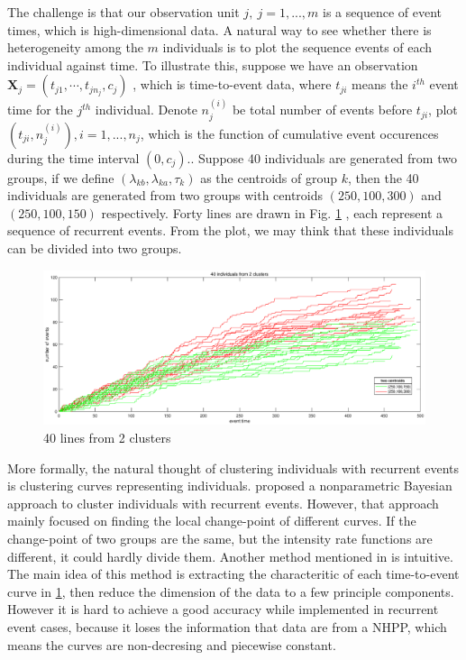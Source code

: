 \documentclass[12pt]{article}
\begin{document}
The challenge is that our observation unit $j,~j=1,...,m$ is a sequence of event times, which is high-dimensional data. A natural way to see whether there is heterogeneity among the $m$ individuals is to plot the sequence events of each individual against time. To illustrate this, suppose we have an observation $\pmb X_j = (t_{j1}, \cdots, t_{jn_j}, c_j)$ , which is time-to-event data, where $t_{ji}$ means the $i^{th}$ event time for the $j^{th}$ individual. Denote $n_j^{(i)}$ be total number of events before $t_{ji}$, plot $(t_{ji},n_j^{(i)}),i=1,...,n_j$, which is the function of cumulative event occurences during the time interval $(0,c_j)$.. Suppose 40 individuals are generated from two groups, if we define $(\lambda_{kb},\lambda_{ka},\tau_k)$ as the centroids of group $k$, then the 40 individuals are generated from two groups with centroids $(250,100,300)$ and $(250,100,150)$ respectively. Forty lines are drawn in Fig. \ref{fig:forty_lines} , each represent a sequence of recurrent events. From the plot, we may think that these individuals can be divided into two groups.





\begin{figure} [htp]
 \includegraphics[width=\textwidth,height=0.6\textheight]{./figure/forty_lines.eps}
  \vspace{-30pt}
  \caption{40 lines from 2 clusters  }\label{fig:forty_lines}
\end{figure} %





More formally, the natural thought of clustering individuals with recurrent events is clustering curves representing individuals. \citet{dass2015clustering} proposed a nonparametric Bayesian approach to cluster individuals with recurrent events. However, that approach mainly focused on finding the local change-point of different curves. If the change-point of two groups are the same, but the intensity rate functions are different, it could hardly divide them. Another method mentioned in \cite{perets2011clustering} is intuitive. The main idea of this method is extracting the characteritic of each time-to-event curve in \ref{fig:forty_lines}, then reduce the dimension of the data to a few principle components. However it is hard to achieve a good accuracy while implemented in recurrent event cases, because it loses the information that data are from a NHPP, which means the curves are non-decresing and piecewise constant.  
\end{document}
